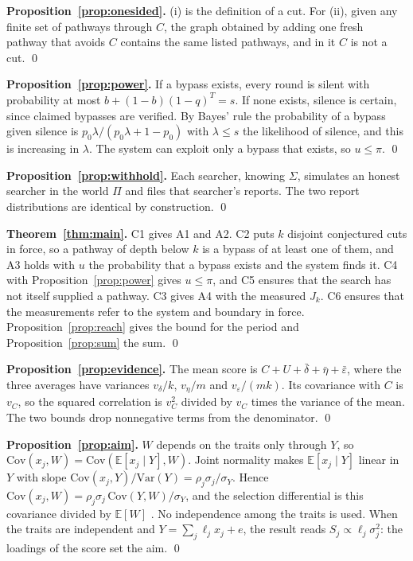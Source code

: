 \documentclass[10pt,twocolumn,letterpaper]{article}
\theoremstyle{definition}
\newcommand{\Ex}{\mathbb{E}}
\begin{document}
\textbf{Proposition~\ref{prop:onesided}.} (i) is the definition of a cut. For (ii), given any finite set of pathways through $C$, the graph obtained by adding one fresh pathway that avoids $C$ contains the same listed pathways, and in it $C$ is not a cut. \qed

\textbf{Proposition~\ref{prop:power}.} If a bypass exists, every round is silent with probability at most $b+(1-b)(1-q)^{T}=s$. If none exists, silence is certain, since claimed bypasses are verified. By Bayes' rule the probability of a bypass given silence is $p_{0}\lambda/(p_{0}\lambda+1-p_{0})$ with $\lambda\le s$ the likelihood of silence, and this is increasing in $\lambda$. The system can exploit only a bypass that exists, so $u\le\pi$. \qed

\textbf{Proposition~\ref{prop:withhold}.} Each searcher, knowing $\Sigma$, simulates an honest searcher in the world $\Pi$ and files that searcher's reports. The two report distributions are identical by construction. \qed

\textbf{Theorem~\ref{thm:main}.} C1 gives A1 and A2. C2 puts $k$ disjoint conjectured cuts in force, so a pathway of depth below $k$ is a bypass of at least one of them, and A3 holds with $u$ the probability that a bypass exists and the system finds it. C4 with Proposition~\ref{prop:power} gives $u\le\pi$, and C5 ensures that the search has not itself supplied a pathway. C3 gives A4 with the measured $J_{k}$. C6 ensures that the measurements refer to the system and boundary in force. Proposition~\ref{prop:reach} gives the bound for the period and Proposition~\ref{prop:sum} the sum. \qed

\textbf{Proposition~\ref{prop:evidence}.} The mean score is $C+U+\bar\delta+\bar\eta+\bar\varepsilon$, where the three averages have variances $v_{\delta}/k$, $v_{\eta}/m$ and $v_{\varepsilon}/(mk)$. Its covariance with $C$ is $v_{C}$, so the squared correlation is $v_{C}^{2}$ divided by $v_{C}$ times the variance of the mean. The two bounds drop nonnegative terms from the denominator. \qed

\textbf{Proposition~\ref{prop:aim}.} $W$ depends on the traits only through $Y$, so $\mathrm{Cov}(x_{j},W)=\mathrm{Cov}(\Ex[x_{j}\mid Y],W)$. Joint normality makes $\Ex[x_{j}\mid Y]$ linear in $Y$ with slope $\mathrm{Cov}(x_{j},Y)/\mathrm{Var}(Y)=\rho_{j}\sigma_{j}/\sigma_{Y}$. Hence $\mathrm{Cov}(x_{j},W)=\rho_{j}\sigma_{j}\,\mathrm{Cov}(Y,W)/\sigma_{Y}$, and the selection differential is this covariance divided by $\Ex[W]$ \cite{price}. No independence among the traits is used. When the traits are independent and $Y=\sum_{j}\ell_{j}x_{j}+e$, the result reads $S_{j}\propto\ell_{j}\sigma_{j}^{2}$: the loadings of the score set the aim. \qed
\end{document}
